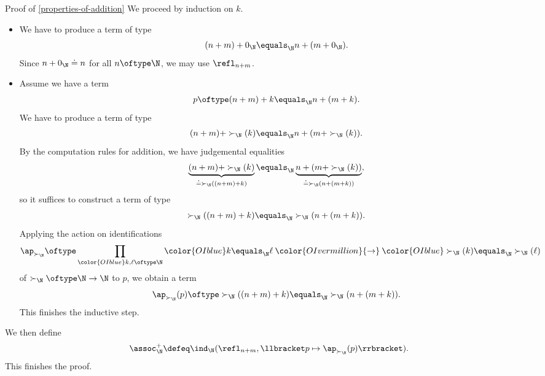 \begin{Proof}{Proof of \cref{properties-of-addition}}
    We proceed by induction on $k$.
    \begin{itemize}
        \item{}We have to produce a term of type
            \[
                (n+m)+0_{\N}%
                \equals_{\N}%
                n+(m+0_{\N}).%
            \]%
            Since $n+0_{\N}\doteq n$ for all $n\oftype\N$, we may use $\refl_{n+m}$.
        \item{}Assume we have a term
            \[
                p%
                \oftype%
                (n+m)+k%
                \equals_{\N}%
                n+(m+k).%
            \]%
            We have to produce a term of type
            \[
                (n+m)+\succ_{\N}(k)%
                \equals_{\N}%
                n+(m+\succ_{\N}(k)).%
            \]%
            By the computation rules for addition, we have judgemental equalities
            \[
                \underbrace{(n+m)+\succ_{\N}(k)}_{{}\doteq\succ_{\N}((n+m)+k)}%
                \equals_{\N}%
                \underbrace{n+(m+\succ_{\N}(k))}_{{}\doteq\succ_{\N}(n+(m+k))},%
            \]%
            so it suffices to construct a term of type
            \[
                \succ_{\N}((n+m)+k)%
                \equals_{\N}%
                \succ_{\N}(n+(m+k)).%
            \]%
            Applying the action on identifications
            \[
                \ap_{\succ_{\N}}%
                \oftype%
                \prod_{{\color{OIblue}k,\ell\oftype\N}}{\color{OIblue}k\equals_{\N}\ell}\mathbin{\color{OIvermillion}{\to}}{\color{OIblue}\succ_{\N}(k)\equals_{\N}\succ_{\N}(\ell)}%
            \]%
            of $\succ_{\N}\oftype\N\to\N$ to $p$, we obtain a term
            \[
                \ap_{\succ_{\N}}(p)%
                \oftype%
                \succ_{\N}((n+m)+k)%
                \equals_{\N}%
                \succ_{\N}(n+(m+k)).%
            \]%
            This finishes the inductive step.
    \end{itemize}
    We then define
    \[
        \assoc^{+}_{\N}%
        \defeq%
        \ind_{\N}(\refl_{n+m},\llbracket p\mapsto\ap_{\succ_{\N}}(p)\rrbracket).%
    \]%
    This finishes the proof.


\end{Proof}

